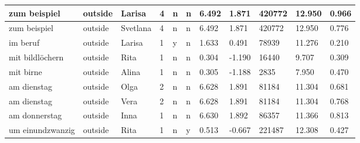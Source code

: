 \begin{longtable}{|p{4cm}|p{1cm}|p{1.2cm}|p{0.5cm}|p{0.5cm}|p{0.5cm}|R{1cm}|R{1cm}|R{1cm}|R{1cm}|R{1cm}|}
zum beispiel               & outside           & Larisa        & 4                                   & n                          & n                          & 6.492      & 1.871         & 420772                  & 12.950                        & 0.966                   \\ \hline
zum beispiel               & outside           & Svetlana      & 4                                   & n                          & n                          & 6.492      & 1.871         & 420772                  & 12.950                        & 0.776                   \\ \hline
im beruf                   & outside           & Larisa        & 1                                   & y                          & n                          & 1.633      & 0.491         & 78939                   & 11.276                        & 0.210                   \\ \hline
mit bildl\"{o}chern        & outside           & Rita          & 1                                   & n                          & n                          & 0.304      & -1.190        & 16440                   & 9.707                         & 0.309                   \\ \hline
mit birne                  & outside           & Alina         & 1                                   & n                          & n                          & 0.305      & -1.188        & 2835                    & 7.950                         & 0.470                   \\ \hline
am dienstag                & outside           & Olga          & 2                                   & n                          & n                          & 6.628      & 1.891         & 81184                   & 11.304                        & 0.681                   \\ \hline
am dienstag                & outside           & Vera          & 2                                   & n                          & n                          & 6.628      & 1.891         & 81184                   & 11.304                        & 0.768                   \\ \hline
am donnerstag              & outside           & Inna          & 1                                   & n                          & n                          & 6.630      & 1.892         & 86357                   & 11.366                        & 0.813                   \\ \hline
um einundzwanzig           & outside           & Rita          & 1                                   & n                          & y                          & 0.513      & -0.667        & 221487                  & 12.308                        & 0.427                   \\ \hline

\end{longtable}
